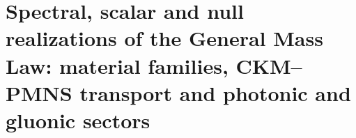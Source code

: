 \chapter{Spectral, scalar and null realizations of the General Mass Law: material families, CKM--PMNS transport and photonic and gluonic sectors}
\label{chap:md-realizaciones-masicas-definitivo}
\begingroup
\let\HMTOwnerSection\section
\let\HMTOwnerSubsection\subsection
\let\HMTOwnerSubsubsection\subsubsection
\let\HMTOwnerParagraph\paragraph
\let\chapter\HMTOwnerSection
\let\section\HMTOwnerSubsection
\let\subsection\HMTOwnerSubsubsection
\let\subsubsection\HMTOwnerParagraph

\endgroup
\begingroup
\renewcommand{\chapter}[2][]{}%

\endgroup


